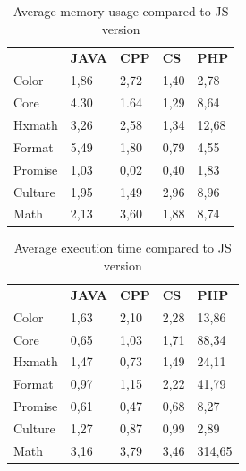 \begin{table}[]
	\centering

	\begin{tabular}{|l|l|l|l|l|}
		\hline
		& \textbf{JAVA} & \textbf{CPP}  & \textbf{CS}   & \textbf{PHP}   \\ \hhline{|=|=|=|=|=|}
		Color   & 1,86 & 2,72 & 1,40 & 2,78  \\ \hline
		Core    & 4.30 & 1.64 & 1,29 & 8,64  \\ \hline
		Hxmath  & 3,26 & 2,58 & 1,34 & 12,68 \\ \hline
		Format  & 5,49 & 1,80 & 0,79 & 4,55  \\ \hline
		Promise & 1,03 & 0,02 & 0,40 & 1,83  \\ \hline
		Culture & 1,95 & 1,49 & 2,96 & 8,96  \\ \hline
		Math    & 2,13 & 3,60 & 1,88 & 8,74  \\ \hline
	\end{tabular}
		\caption{Average memory usage compared to JS version}
		\label{my-label}
\end{table}
\begin{table}[]
	\centering

	\begin{tabular}{|l|l|l|l|l|}
		\hline
		& \textbf{JAVA} & \textbf{CPP}  & \textbf{CS}   & \textbf{PHP}    \\ 	\hhline{|=|=|=|=|=|}
		Color   & 1,63 & 2,10 & 2,28 & 13,86  \\ \hline
		Core    & 0,65 & 1,03 & 1,71 & 88,34  \\ \hline
		Hxmath  & 1,47 & 0,73 & 1,49 & 24,11  \\ \hline
		Format  & 0,97 & 1,15 & 2,22 & 41,79  \\ \hline
		Promise & 0,61 & 0,47 & 0,68 & 8,27   \\ \hline
		Culture & 1,27 & 0,87 & 0,99 & 2,89   \\ \hline
		Math    & 3,16 & 3,79 & 3,46 & 314,65 \\ \hline
	\end{tabular}
		\caption{Average execution time compared to JS version}
		\label{my-label}
\end{table}

